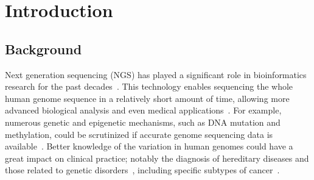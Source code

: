 \documentclass{PHlab-thesis}
\begin{document}
\newcommand*\Acknowledgements{%
首先我想在這裡感謝我的指導教授賀保羅老師。對於大學期間沒有涉略生物相關基礎知識的我來說，透過老師的幫忙讓我了解基因序列分析常用的技巧與困難，也才衍生出進行這份研究的動機。在討論的過程中，也很感謝老師給予的指教，讓我在面對困難時更快速的找到解決問題的方向。本論文的完成同時還要感謝原論文 EAGLE 的主要作者之一 Tony Kuo，除了和我分享當時研究時的寶貴經驗，還提供了當初實驗的測試資料，使我們在本論文中能更客觀地針對結果進行比較與分析。最後，也要感謝這兩年來在實驗室一起奮鬥過的所有同學們，面對大家普遍陌生的生物資訊領域，彼此教學相長，透過不斷的交流討論更快速的習得各方面的專業知識。
}



\renewcommand\nomgroup[1]{%
  \item[\bfseries
  \ifstrequal{#1}{A}{General}{%
  \ifstrequal{#1}{Z}{Gene/Protein Names}%
  }]}



\printnomenclature[5cm]

\newpage
\setcounter{page}{1}


\chapter{Introduction}
\section{Background}
Next generation sequencing (NGS) has played a significant role in bioinformatics research for the past decades~\cite{behjati2013next,schuster2008next}. This technology enables sequencing the whole human genome sequence in a relatively short amount of time, allowing more advanced biological analysis and even medical applications~\cite{roukos2010next}. For example, numerous genetic and epigenetic mechanisms, such as DNA mutation and methylation, could be scrutinized if accurate genome sequencing data is available~\cite{moore2013dna}. Better knowledge of the variation in human genomes could have a great impact on clinical practice; notably the diagnosis of hereditary diseases and those related to genetic disorders~\cite{shashi2014utility,stenson2017human}, including specific subtypes of cancer~\cite{serrati2016next}.
\end{document}
